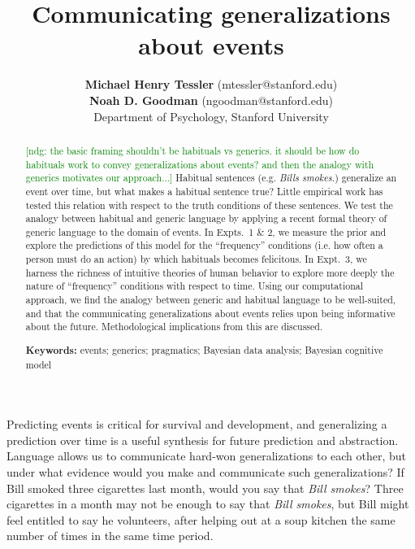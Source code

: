 \documentclass[10pt,letterpaper]{article}
\title{Communicating generalizations about events}
\author{{\large \bf Michael Henry Tessler} (mtessler@stanford.edu) \\
 {\large \bf Noah D. Goodman} (ngoodman@stanford.edu) \\
  Department of Psychology, Stanford University}
\newcommand{\ndg}[1]{\textcolor{Green}{[ndg: #1]}}
\begin{document}
\maketitle


\begin{abstract}
\ndg{the basic framing shouldn't be habituals vs generics. it should be how do habituals work to convey generalizations about events? and then the analogy with generics motivates our approach...}
Habitual sentences (e.g. \emph{Bills smokes.}) generalize an event over time, but what makes a habitual sentence true?
Little empirical work has tested this relation with respect to the truth conditions of these sentences. 
We test the analogy between habitual and generic language by applying a recent formal theory of generic language to the domain of events.
In Expts.~1 \& 2, we measure the prior and explore the predictions of this model for the
``frequency'' conditions (i.e. how often a person must do an action) 
by which habituals becomes felicitous.
In Expt.~3, we harness the richness of intuitive theories of human behavior to explore more deeply the nature of ``frequency'' conditions with respect to time.
Using our computational approach, we find the analogy between generic and habitual language to be well-suited, and that the communicating generalizations about events relies upon being informative about the future.
Methodological implications from this are discussed.


\textbf{Keywords:} 
events; generics; pragmatics; Bayesian data analysis; Bayesian cognitive model
\end{abstract}


Predicting events is critical for survival and development, and generalizing a prediction over time is a useful synthesis for future prediction and abstraction.
Language allows us to communicate hard-won generalizations to each other, but under what evidence would you make and communicate such generalizations?
If Bill smoked three cigarettes last month, would you say that \emph{Bill smokes}?
Three cigarettes in a month may not be enough to say that \emph{Bill smokes}, but Bill might feel entitled to say he volunteers, after helping out at a soup kitchen the same number of times in the same time period.
\end{document}
